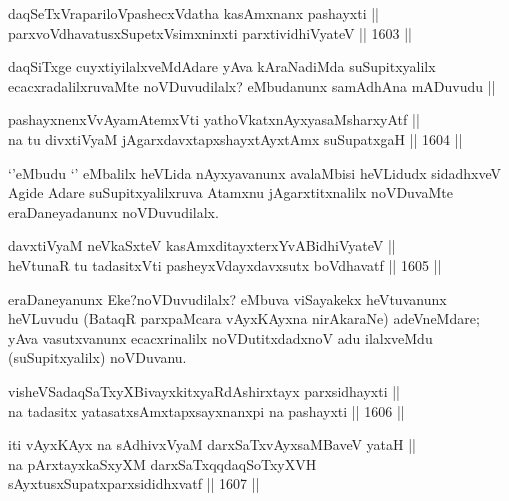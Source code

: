 \begin{shl}
daqSeTxVrapariloVpashecxVdatha kasAmxnanx pashayxti || \\
parxvoVdhavatusxSupetxV\s simxninxti parxtividhiVyateV ||  1603 || 
\end{shl}

\begin{artha}
daqSiTxge cuyxtiyilalxveMdAdare yAva kAraNadiMda suSupitxyalilx ecacxradalilxruvaMte noVDuvudilalx? eMbudanunx samAdhAna mADuvudu ||
\end{artha}

\begin{shl}
pashayxnenxVvAyamAtemxVti yathoVkatxnAyxyasaMsharxyAtf ||  \\
na tu divxtiVyaM jAgarxdavxtapxshayxtAyxtAmx suSupatxgaH ||  1604 ||  
\end{shl}

\begin{artha}
`\stext'eMbudu `\stext' eMbalilx heVLida nAyxyavanunx avalaMbisi heVLidudx sidadhxveV Agide Adare suSupitxyalilxruva Atamxnu jAgarxtitxnalilx noVDuvaMte eraDaneyadanunx noVDuvudilalx.
\end{artha}

\begin{shl}
davxtiVyaM neVkaSxteV kasAmxditayxterxYvABidhiVyateV || \\
heVtunaR tu tadasitxVti pasheyxVdayxdavxsutx boVdhavatf ||  1605 ||  
\end{shl}

\begin{artha}
eraDaneyanunx Eke?noVDuvudilalx? eMbuva viSayakekx heVtuvanunx heVLuvudu (BataqR parxpaMcara vAyxKAyxna nirAkaraNe) adeVneMdare; yAva vasutxvanunx ecacxrinalilx noVDutitxdadxnoV adu ilalxveMdu (suSupitxyalilx) noVDuvanu.
\end{artha}


\begin{shl}
visheVSadaqSaTxyXBivayxkitxyaRdAshirxtayx parxsidhayxti ||  \\
na tadasitx yatasatxsAmxtapxsayxnanxpi na pashayxti ||  1606 ||  
\end{shl}


\begin{shl}
iti vAyxKAyx na sAdhivxVyaM darxSaTxvAyxsaMBaveV yataH || \\
na pArxtayxkaSxyXM darxSaTxqqdaqSoTxyXVH sAyxtusxSupatxparxsididhxvatf ||  1607 ||  
\end{shl}

